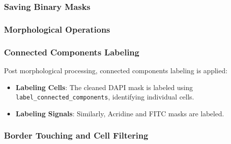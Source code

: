 \documentclass[a4paper,12pt]{article}
\begin{document}
\subsubsection{Saving Binary Masks}


\subsubsection{Morphological Operations}


\subsubsection{Connected Components Labeling}

Post morphological processing, connected components labeling is applied:
\begin{itemize}
    \item \textbf{Labeling Cells}: The cleaned DAPI mask is labeled using \texttt{label\_connected\_components}, identifying individual cells.
    \item \textbf{Labeling Signals}: Similarly, Acridine and FITC masks are labeled.
\end{itemize}

\subsubsection{Border Touching and Cell Filtering}

\end{document}
